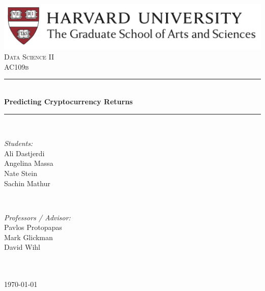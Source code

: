 \documentclass[12pt,twoside]{article}
\begin{document}
\thispagestyle{empty}
\newcommand{\HRule}{\rule{\linewidth}{0.5mm}} %

\begin{center} %
\vspace{5mm}
\includegraphics[scale=0.5]{logo_gsas}\\[3cm]
\textsc{\Large Data Science II}\\[0.5cm] %
\textsc{\large AC109b}\\[2cm] %

\HRule \\[0.4cm]
{ \huge \bfseries Predicting Cryptocurrency Returns}\\[0.4cm] %
\HRule \\[2.5cm]


\begin{minipage}{0.4\textwidth}
\begin{flushleft} \large
\emph{Students:}\\
Ali Dastjerdi\\
Angelina Massa\\
Nate Stein\\
Sachin Mathur\\
\end{flushleft}
\end{minipage}
~
\begin{minipage}{0.4\textwidth}
\begin{flushright} \large
\emph{Professors / Advisor:} \\
Pavlos Protopapas \\
Mark Glickman \\
David Wihl \\
\hspace{1mm}\\
\end{flushright}
\end{minipage}\\[2cm]

{\large \today}\\[2cm]
\end{center}
\end{document}
